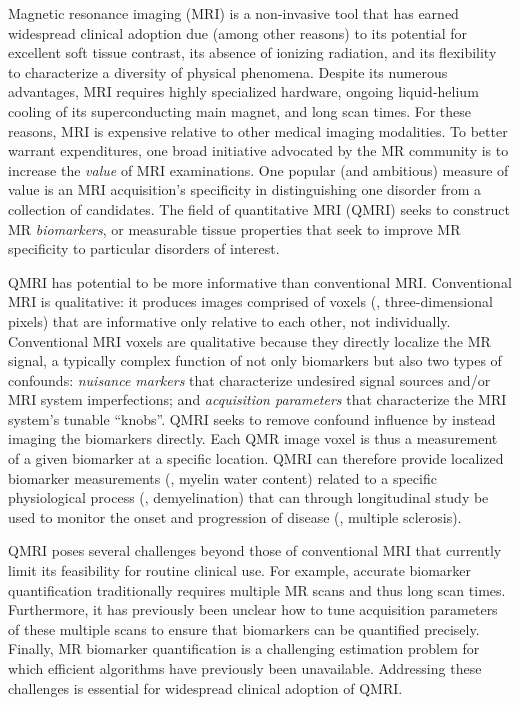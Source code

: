 
Magnetic resonance imaging (MRI)
is a non-invasive tool
that has earned widespread clinical adoption
due (among other reasons) 
to its potential for excellent soft tissue contrast,
its absence of ionizing radiation,
and its flexibility to characterize 
a diversity of physical phenomena. 
Despite its numerous advantages,
MRI requires highly specialized hardware,
ongoing liquid-helium cooling
of its superconducting main magnet,
and long scan times.
For these reasons,
MRI is expensive relative
to other medical imaging modalities.
To better warrant expenditures,
one broad initiative advocated by the MR community 
is to increase the \emph{value}
of MRI examinations.
One popular (and ambitious) measure of value
is an MRI acquisition's specificity
in distinguishing one disorder
from a collection of candidates.
The field of quantitative MRI (QMRI)
seeks to construct MR \emph{biomarkers},
or measurable tissue properties
that seek to improve MR specificity 
to particular disorders of interest.

QMRI has potential
to be more informative than conventional MRI.
Conventional MRI is qualitative:
it produces images comprised of voxels
(\ie, three-dimensional pixels)
that are informative only relative to each other,
not individually.
Conventional MRI voxels are qualitative
because they directly localize the MR signal,
a typically complex function
of not only biomarkers
but also two types of confounds:
\emph{nuisance markers}
that characterize undesired signal sources
and/or MRI system imperfections;
and \emph{acquisition parameters}
that characterize the MRI system's tunable ``knobs''. 
QMRI seeks to remove confound influence
by instead imaging the biomarkers directly.
Each QMR image voxel
is thus a measurement 
of a given biomarker
at a specific location.
QMRI can therefore provide localized biomarker measurements
(\eg, myelin water content)
related to a specific physiological process
(\eg, demyelination)
that can through longitudinal study
be used to monitor the onset and progression of disease
(\eg, multiple sclerosis).

QMRI poses several challenges
beyond those of conventional MRI 
that currently limit its feasibility 
for routine clinical use.
For example,
accurate biomarker quantification 
traditionally requires multiple MR scans
and thus long scan times.
Furthermore,
it has previously been unclear
how to tune acquisition parameters 
of these multiple scans
to ensure that biomarkers can be quantified precisely.
Finally, MR biomarker quantification
is a challenging estimation problem
for which efficient algorithms
have previously been unavailable.
Addressing these challenges is essential
for widespread clinical adoption of QMRI.

